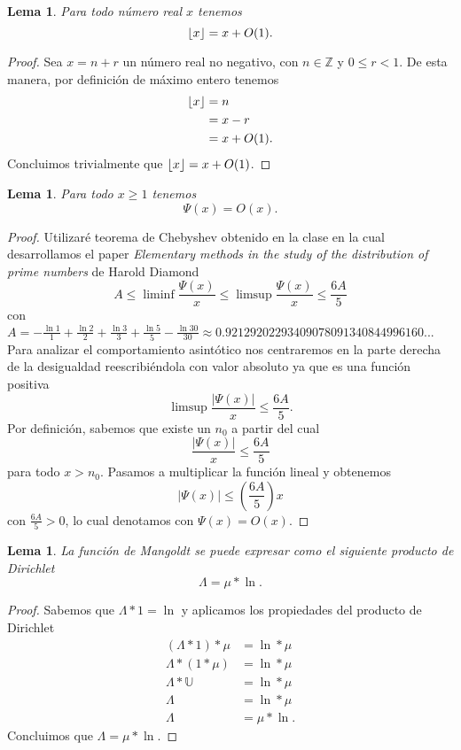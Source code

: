 \documentclass{article}
\DeclarePairedDelimiter\floor{\lfloor}{\rfloor}
\newtheorem{lemma}[theorem]{Lema}
\theoremstyle{definition}
\theoremstyle{remark}
\newcommand{\BZ}{\mathbb Z}
\begin{document}
\begin{lemma}
Para todo n\'umero real $x$ tenemos
$$\floor{x} = x + O(1).$$
\end{lemma}

\begin{proof}
Sea $x = n + r$ un n\'umero real no negativo, con $n \in \BZ$ y $0 \leq r < 1$. De esta manera, por definici\'on de m\'aximo entero tenemos
\begin{align*}
\floor{x} &= n \\
&= x - r \\
&= x + O(1).
\end{align*}
Concluimos trivialmente que $\floor{x} = x + O(1)$.
\end{proof}

\begin{lemma}
Para todo $x \geq 1$ tenemos
$$\Psi(x) = O(x).$$
\end{lemma}

\begin{proof}
Utilizar\'e teorema de Chebyshev obtenido en la clase en la cual desarrollamos el paper \textit{Elementary methods in the study of the distribution of prime numbers} de Harold Diamond
$$A \leq \liminf \frac{\Psi(x)}{x} \leq \limsup \frac{\Psi(x)}{x} \leq \frac{6A}{5}$$
con $A = -\frac{\ln 1}{1} + \frac{\ln 2}{2} + \frac{\ln 3}{3} + \frac{\ln 5}{5} - \frac{\ln 30}{30} \approx 0.92129202293409078091340844996160...$
Para analizar el comportamiento asint\'otico nos centraremos en la parte derecha de la desigualdad reescribi\'endola con valor absoluto ya que es una funci\'on positiva
$$\limsup \frac{|\Psi(x)|}{x} \leq \frac{6A}{5}.$$
Por definici\'on, sabemos que existe un $n_0$ a partir del cual
$$\frac{|\Psi(x)|}{x} \leq \frac{6A}{5}$$
para todo $x > n_0$. Pasamos a multiplicar la funci\'on lineal y obtenemos
$$|\Psi(x)| \leq \left(\frac{6A}{5}\right) x$$
con $\frac{6A}{5} > 0$, lo cual denotamos con $\Psi(x) = O(x)$.
\end{proof}

\begin{lemma}
La funci\'on de Mangoldt se puede expresar como el siguiente producto de Dirichlet
$$\Lambda = \mu * \ln.$$
\end{lemma}

\begin{proof}
Sabemos que $\Lambda * 1 = \ln$ y aplicamos los propiedades del producto de Dirichlet
\begin{align*}
(\Lambda * 1) * \mu &= \ln * \mu \\
\Lambda * (1 * \mu) &= \ln * \mu \\
\Lambda * \mathbb{U} &= \ln * \mu \\
\Lambda &= \ln * \mu \\
\Lambda &= \mu * \ln.
\end{align*}
Concluimos que $\Lambda = \mu * \ln$.
\end{proof}
\end{document}

